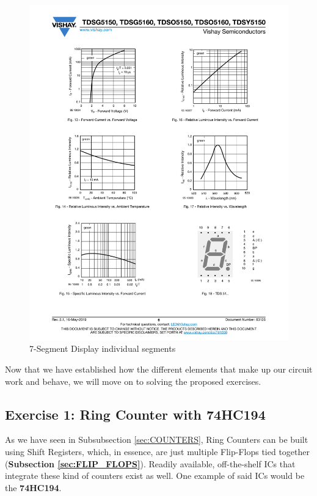 \begin{figure}[H]
    \centering
    \includegraphics[]{Graphics/VHDL/Practice 5/7-SEG/SEGMENTS.pdf}
    \caption{7-Segment Display individual segments ~\autocite{7-SEGMENT}}
    \label{fig:7-SEG-SEGMENTS}
\end{figure}

\clearpage

Now that we have established how the different elements that make up our circuit work and behave, we will move on to solving the proposed exercises.

\subsection{Exercise 1: Ring Counter with 74HC194}

As we have seen in Subsubsection \ref{sec:COUNTERS}, Ring Counters can be built using Shift Registers, which, in essence, are just multiple Flip-Flops tied together (\textbf{Subsection \ref{sec:FLIP_FLOPS}}). Readily available, off-the-shelf ICs that integrate these kind of counters exist as well. One example of said ICs would be the \textbf{74HC194}. \medskip

